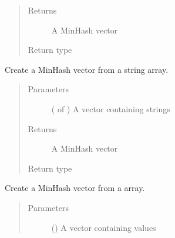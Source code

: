 \documentclass[letterpaper,10pt,english]{sphinxmanual}
\begin{document}
\begin{fulllineitems}
\begin{fulllineitems}
\begin{quote}
\begin{description}
\item[{Returns}] \leavevmode
A MinHash vector

\item[{Return type}] \leavevmode
{}

\end{description}\end{quote}

\end{fulllineitems}


\begin{fulllineitems}
\label{\detokenize{documentation:tmap.Minhash.from_string_array}}
Create a MinHash vector from a string array.
\begin{quote}\begin{description}
\item[{Parameters}] \leavevmode
{} ( of ) \textendash{} A vector containing strings

\item[{Returns}] \leavevmode
A MinHash vector

\item[{Return type}] \leavevmode
{}

\end{description}\end{quote}

\end{fulllineitems}


\begin{fulllineitems}
\label{\detokenize{documentation:tmap.Minhash.from_weight_array}}
Create a MinHash vector from a  array.
\begin{quote}\begin{description}
\item[{Parameters}] \leavevmode
{} () \textendash{} A vector containing  values


\end{description}
\end{quote}
\end{fulllineitems}
\end{fulllineitems}
\end{document}

